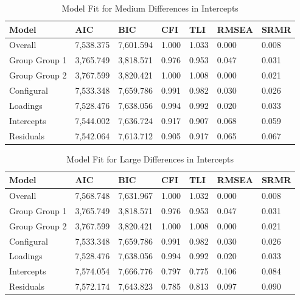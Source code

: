 \documentclass[
  man]{apa7}
\begin{document}
\begin{table}[tbp]

\begin{center}
\begin{threeparttable}

\caption{\label{tab:tab6}Model Fit for Medium Differences in Intercepts}

\begin{tabular}{lllllll}
\toprule
Model & AIC & BIC & CFI & TLI & RMSEA & SRMR\\
\midrule
Overall & 7,538.375 & 7,601.594 & 1.000 & 1.033 & 0.000 & 0.008\\
Group Group 1 & 3,765.749 & 3,818.571 & 0.976 & 0.953 & 0.047 & 0.031\\
Group Group 2 & 3,767.599 & 3,820.421 & 1.000 & 1.008 & 0.000 & 0.021\\
Configural & 7,533.348 & 7,659.786 & 0.991 & 0.982 & 0.030 & 0.026\\
Loadings & 7,528.476 & 7,638.056 & 0.994 & 0.992 & 0.020 & 0.033\\
Intercepts & 7,544.002 & 7,636.724 & 0.917 & 0.907 & 0.068 & 0.059\\
Residuals & 7,542.064 & 7,613.712 & 0.905 & 0.917 & 0.065 & 0.067\\
\bottomrule
\end{tabular}

\end{threeparttable}
\end{center}

\end{table}

\begin{table}[tbp]

\begin{center}
\begin{threeparttable}

\caption{\label{tab:tab7}Model Fit for Large Differences in Intercepts}

\begin{tabular}{lllllll}
\toprule
Model & AIC & BIC & CFI & TLI & RMSEA & SRMR\\
\midrule
Overall & 7,568.748 & 7,631.967 & 1.000 & 1.032 & 0.000 & 0.008\\
Group Group 1 & 3,765.749 & 3,818.571 & 0.976 & 0.953 & 0.047 & 0.031\\
Group Group 2 & 3,767.599 & 3,820.421 & 1.000 & 1.008 & 0.000 & 0.021\\
Configural & 7,533.348 & 7,659.786 & 0.991 & 0.982 & 0.030 & 0.026\\
Loadings & 7,528.476 & 7,638.056 & 0.994 & 0.992 & 0.020 & 0.033\\
Intercepts & 7,574.054 & 7,666.776 & 0.797 & 0.775 & 0.106 & 0.084\\
Residuals & 7,572.174 & 7,643.823 & 0.785 & 0.813 & 0.097 & 0.090\\
\bottomrule
\end{tabular}

\end{threeparttable}
\end{center}

\end{table}
\end{document}
